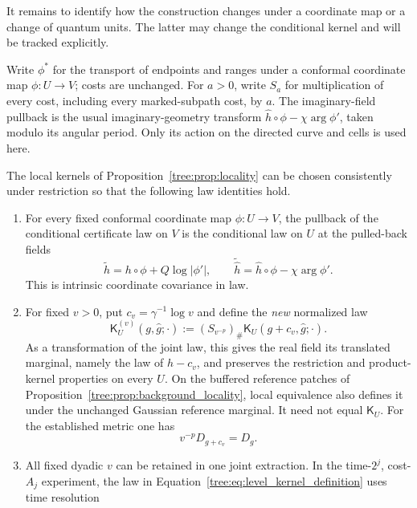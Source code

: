 It remains to identify how the construction changes under a coordinate
map or a change of quantum units. The latter may change the conditional
kernel and will be tracked explicitly.

Write $\phi^*$ for the transport of endpoints and ranges under a
conformal coordinate map $\phi:U\to V$; costs are unchanged.  For
$a>0$, write $S_a$ for multiplication of every cost, including
every marked-subpath cost, by $a$.  The imaginary-field pullback
is the usual imaginary-geometry transform
$\widehat h\circ\phi-\chi\arg\phi'$, taken modulo its angular
period.  Only its action on the directed curve and cells is used
here.

\begin{proposition}
\label{tree:prop:zoom_transport}
The local kernels of Proposition~\ref{tree:prop:locality} can be chosen
consistently under restriction so that the following law identities
hold.
\begin{enumerate}
\item For every fixed conformal coordinate map $\phi:U\to V$,
the pullback of the conditional certificate law on $V$ is the
conditional law on $U$ at the pulled-back fields
\[
 \widetilde h=h\circ\phi+Q\log|\phi'|,
 \qquad
 \widetilde{\widehat h}=\widehat h\circ\phi-\chi\arg\phi'.
\]
This is intrinsic coordinate covariance in law.
\item For fixed $v>0$, put $c_v=\gamma^{-1}\log v$ and define
the \emph{new} normalized law
\begin{equation}\label{tree:eq:level_kernel_definition}
 \mathsf K_U^{(v)}(g,\widehat g;\cdot)
  :=(S_{v^{-p}})_\#
     \mathsf K_U(g+c_v,\widehat g;\cdot).
\end{equation}
As a transformation of the joint law, this gives the real field its
translated marginal, namely the law of $h-c_v$, and preserves the
restriction and product-kernel properties on every $U$. On the buffered
reference patches of Proposition~\ref{tree:prop:background_locality},
local equivalence also defines it under the unchanged Gaussian
reference marginal. It need not equal $\mathsf K_U$.
For the established metric one has
\begin{equation}\label{tree:eq:reference_quantum_units}
             v^{-p}D_{g+c_v}=D_g.
\end{equation}
\item All fixed dyadic $v$ can be retained in one joint
extraction.  In the time-$2^j$, cost-$A_j$ experiment, the law
in Equation~\eqref{tree:eq:level_kernel_definition} uses time resolution

\end{enumerate}
\end{proposition}
